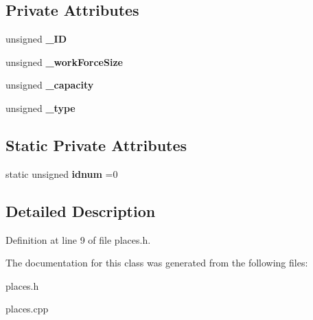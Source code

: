 \subsection*{Private Attributes}
\begin{DoxyCompactItemize}
\item 
\mbox{\label{classplace_a905b649d1f98547cc33d49226f4e56e1}} 
unsigned {\bfseries \+\_\+\+ID}
\item 
\mbox{\label{classplace_a675f8c9a2bd0c57ac1aaf0364cd63411}} 
unsigned {\bfseries \+\_\+work\+Force\+Size}
\item 
\mbox{\label{classplace_ac74e8a9d1409cec4421a038885012a8b}} 
unsigned {\bfseries \+\_\+capacity}
\item 
\mbox{\label{classplace_a4289f32750fe9e9b0632afe207dd999b}} 
unsigned {\bfseries \+\_\+type}
\end{DoxyCompactItemize}
\subsection*{Static Private Attributes}
\begin{DoxyCompactItemize}
\item 
\mbox{\label{classplace_af35d12619e41bd59aa91db9977fc8dc9}} 
static unsigned {\bfseries idnum} =0
\end{DoxyCompactItemize}


\subsection{Detailed Description}


Definition at line 9 of file places.\+h.



The documentation for this class was generated from the following files\+:\begin{DoxyCompactItemize}
\item 
places.\+h\item 
places.\+cpp\end{DoxyCompactItemize}
